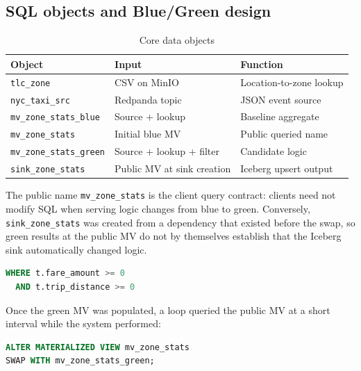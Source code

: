 \clearpage
\onecolumn
\subsection{SQL objects and Blue/Green design}
\begin{table}[H]
\centering
\caption{Core data objects}
\begin{tabularx}{\textwidth}{@{}p{}p{}Y@{}}
\toprule
\textbf{Object} & \textbf{Input} & \textbf{Function}\\
\midrule
\texttt{tlc\_zone} & CSV on MinIO & Location-to-zone lookup\\
\texttt{nyc\_taxi\_src} & Redpanda topic & JSON event source\\
\texttt{mv\_zone\_stats\_blue} & Source + lookup & Baseline aggregate\\
\texttt{mv\_zone\_stats} & Initial blue MV & Public queried name\\
\texttt{mv\_zone\_stats\_green} & Source + lookup + filter & Candidate logic\\
\texttt{sink\_zone\_stats} & Public MV at sink creation & Iceberg upsert output\\
\bottomrule
\end{tabularx}
\end{table}

The public name \texttt{mv\_zone\_stats} is the client query contract: clients need not modify SQL when serving logic changes from blue to green. Conversely, \texttt{sink\_zone\_stats} was created from a dependency that existed before the swap, so green results at the public MV do not by themselves establish that the Iceberg sink automatically changed logic.

\begin{lstlisting}[language=SQL,caption={Additional filtering in the green logic}]
WHERE t.fare_amount >= 0
  AND t.trip_distance >= 0
\end{lstlisting}

Once the green MV was populated, a loop queried the public MV at a short interval while the system performed:

\begin{lstlisting}[language=SQL,caption={Blue/Green MV cutover command}]
ALTER MATERIALIZED VIEW mv_zone_stats
SWAP WITH mv_zone_stats_green;
\end{lstlisting}

